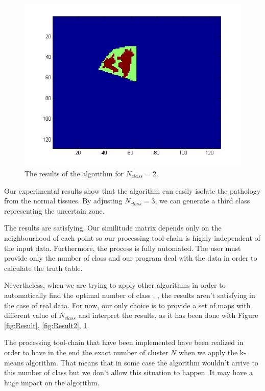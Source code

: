 \begin{figure}
\centering
    \includegraphics[scale=0.5,angle=0]{2class.png}
    \caption{The results of the algorithm for $N_{class} = 2$.}
    \label{fig:Result3}
\end{figure}

Our experimental results show that the algorithm can easily isolate the pathology from the normal tissues. By adjusting $N_{class} = 3$, we can generate a third class representing the uncertain zone.

\medskip

The results are satisfying. Our similitude matrix depends only on the neighbourhood of each point so our processing tool-chain is highly independent of the input data. Furthermore, the process is fully automated. The user must provide only the number of class and our program deal with the data in order to calculate the truth table.

Nevertheless, when we are trying to apply other algorithms in order to automatically find the optimal number of class \cite{zelnik2004self}, \cite{mouysset2010contributions}, the results aren't satisfying in the case of real data. For now, our only choice is to provide a set of maps with different value of $N_{class}$ and interpret the results, as it has been done with Figure \ref{fig:Result}, \ref{fig:Result2}, \ref{fig:Result3}.

\medskip

The processing tool-chain that have been implemented have been realized in order to have in the end the exact number of cluster $N$ when we apply the k-means algorithm. That means that in some case the algorithm wouldn't arrive to this number of class but we don't allow this situation to happen. It may have a huge impact on the algorithm.